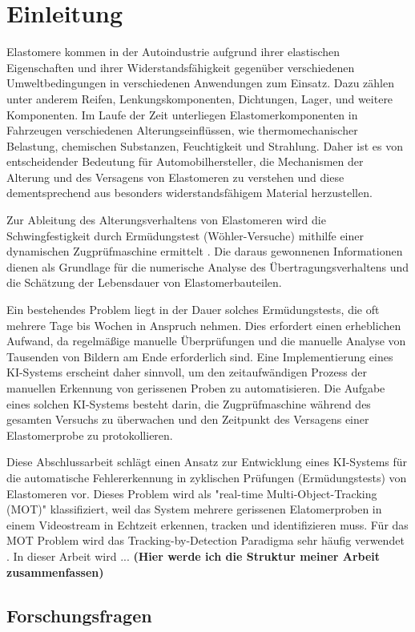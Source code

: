\chapter{Einleitung}
Elastomere kommen in der Autoindustrie aufgrund ihrer elastischen Eigenschaften und ihrer Widerstandsfähigkeit gegenüber verschiedenen Umweltbedingungen in verschiedenen Anwendungen zum Einsatz. Dazu zählen unter anderem Reifen, Lenkungskomponenten, Dichtungen, Lager, und weitere Komponenten. Im Laufe der Zeit unterliegen Elastomerkomponenten in Fahrzeugen verschiedenen Alterungseinflüssen, wie thermomechanischer Belastung, chemischen Substanzen, Feuchtigkeit und Strahlung. Daher ist es von entscheidender Bedeutung für Automobilhersteller, die Mechanismen der Alterung und des Versagens von Elastomeren zu verstehen und diese dementsprechend aus besonders widerstandsfähigem Material herzustellen.

Zur Ableitung des Alterungsverhaltens von Elastomeren wird die Schwingfestigkeit durch Ermüdungstest (Wöhler-Versuche) mithilfe einer dynamischen Zugprüfmaschine ermittelt \cite{elastomeralterung}. Die daraus gewonnenen Informationen dienen als Grundlage für die numerische Analyse des Übertragungsverhaltens und die Schätzung der Lebensdauer von Elastomerbauteilen.

Ein bestehendes Problem liegt in der Dauer solches Ermüdungstests, die oft mehrere Tage bis Wochen in Anspruch nehmen. Dies erfordert einen erheblichen Aufwand, da regelmäßige manuelle Überprüfungen und die manuelle Analyse von Tausenden von Bildern am Ende erforderlich sind. Eine Implementierung eines KI-Systems erscheint daher sinnvoll, um den zeitaufwändigen Prozess der manuellen Erkennung von gerissenen Proben zu automatisieren. Die Aufgabe eines solchen KI-Systems besteht darin, die Zugprüfmaschine während des gesamten Versuchs zu überwachen und den Zeitpunkt des Versagens einer Elastomerprobe zu protokollieren.

Diese Abschlussarbeit schlägt einen Ansatz zur Entwicklung eines KI-Systems für die automatische Fehlererkennung in zyklischen Prüfungen (Ermüdungstests) von Elastomeren vor. Dieses Problem wird als "real-time Multi-Object-Tracking (\acs{MOT})"  klassifiziert, weil das System mehrere gerissenen Elatomerproben in einem Videostream in Echtzeit erkennen, tracken und identifizieren muss. Für das \acs{MOT} Problem wird das Tracking-by-Detection Paradigma sehr häufig verwendet \cite{yu2016poi} \cite{aharon2022botsort} \cite{zhang2022bytetrack} \cite{Chen_2018} \cite{wojke2017simple}. In dieser Arbeit wird ... \textbf{(Hier werde ich die Struktur meiner Arbeit zusammenfassen)}

\section{Forschungsfragen}
